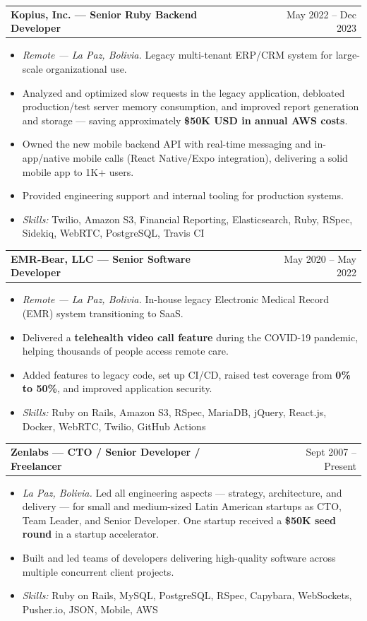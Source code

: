 \documentclass[a4paper,12pt]{article}
\makeatletter
\newcommand{\skillsfont}{\fontsize{9.6}{11.5}\selectfont}
\newenvironment{joblong}[2]
    {
    \begin{tabularx}{\linewidth}{@{}l X r@{}}
    \textbf{#1} & \hfill &  #2 \\[3.75pt]
    \end{tabularx}
    \begin{minipage}[t]{\linewidth}
    \begin{itemize}[nosep,after=\strut, leftmargin=1em, itemsep=3pt,label=--]
    }
    {
    \end{itemize}
    \end{minipage}
    }
\makeatother
\begin{document}
\begin{joblong}{Kopius, Inc. --- Senior Ruby Backend Developer}{May 2022 -- Dec 2023}
\item \textit{Remote --- La Paz, Bolivia.} Legacy multi-tenant ERP/CRM system for
      large-scale organizational use.
\item Analyzed and optimized slow requests in the legacy application, debloated
      production/test server memory consumption, and improved report generation
      and storage --- saving approximately \textbf{\$50K USD in annual AWS costs}.
\item Owned the new mobile backend API with real-time messaging and in-app/native
      mobile calls (React Native/Expo integration), delivering a solid mobile app
      to 1K+ users.
\item Provided engineering support and internal tooling for production systems.
\par\vspace{6pt}\item[]\skillsfont\textit{Skills:} Twilio, Amazon S3, Financial Reporting, Elasticsearch, Ruby, RSpec,
      Sidekiq, WebRTC, PostgreSQL, Travis CI
\end{joblong}

\begin{joblong}{EMR-Bear, LLC --- Senior Software Developer}{May 2020 -- May 2022}
\item \textit{Remote --- La Paz, Bolivia.} In-house legacy Electronic Medical Record
      (EMR) system transitioning to SaaS.
\item Delivered a \textbf{telehealth video call feature} during the COVID-19
      pandemic, helping thousands of people access remote care.
\item Added features to legacy code, set up CI/CD, raised test coverage from
      \textbf{0\% to 50\%}, and improved application security.
\par\vspace{6pt}\item[]\skillsfont\textit{Skills:} Ruby on Rails, Amazon S3, RSpec, MariaDB, jQuery, React.js, Docker,
      WebRTC, Twilio, GitHub Actions
\end{joblong}

\begin{joblong}{Zenlabs --- CTO / Senior Developer / Freelancer}{Sept 2007 -- Present}
\item \textit{La Paz, Bolivia.} Led all engineering aspects --- strategy, architecture,
      and delivery --- for small and medium-sized Latin American startups as CTO,
      Team Leader, and Senior Developer. One startup received a \textbf{\$50K seed
      round} in a startup accelerator.
\item Built and led teams of developers delivering high-quality software across
      multiple concurrent client projects.
\par\vspace{6pt}\item[]\skillsfont\textit{Skills:} Ruby on Rails, MySQL, PostgreSQL, RSpec, Capybara, WebSockets,
      Pusher.io, JSON, Mobile, AWS
\end{joblong}
\end{document}
